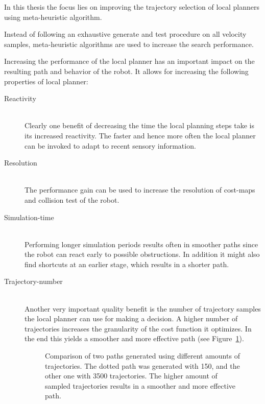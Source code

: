 In this thesis the focus lies on improving the trajectory selection of local planners using meta-heuristic algorithm. 

Instead of following an exhaustive generate and test procedure on all velocity samples, meta-heuristic algorithms are used to increase the search performance. 

Increasing the performance of the local planner has an important impact on the resulting path and behavior of the robot. 
It allows for increasing the following properties of local planner:
\begin{description}
\item[Reactivity]\hfill \\
Clearly one benefit of decreasing the time the local planning steps take is its increased reactivity. The faster and hence more often the local planner can be invoked to adapt to recent sensory information.

\item[Resolution]\hfill \\
The performance gain can be used to increase the resolution of cost-maps and collision test of the robot.

\item[Simulation-time]\hfill \\
Performing longer simulation periods results often in smoother paths since the robot can react early to possible obstructions. In addition it might also find shortcuts at an earlier stage, which results in a shorter path. 

\item[Trajectory-number]\hfill \\
Another very important quality benefit is the number of trajectory samples the local planner can use for making a decision. A higher number of trajectories increases the granularity of the cost function it optimizes. In the end this yields a smoother and more effective path (see Figure~\ref{fig:fig_smooth}).

\begin{figure}[thpb]
   \footnotesize
   \centering
   \setlength\fboxsep{0pt}
   \setlength\fboxrule{0.5pt}
   \myfloatalign
   \captionsetup[subfigure]{labelformat=empty} 
    \subfloat[]
    {  
       \def\svgwidth{\textwidth}
       
    }
    \caption[Comparison of two paths generated using different amounts of trajectories.]{Comparison of two paths generated using different amounts of trajectories. The dotted path was generated with 150, and the other one with 3500 trajectories. The higher amount of sampled trajectories results in a smoother and more effective path.}  
     \label{fig:fig_smooth}
\end{figure}
\end{description}

